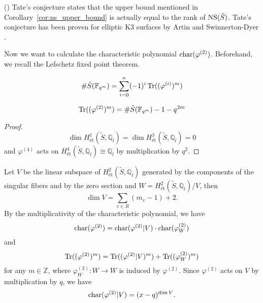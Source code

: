 \documentclass[main]{subfiles}
\begin{document}
\begin{rem}{(\cite[Remark 6.5.]{ref:vanluijk2007})}
    Tate's conjecture states that the upper bound mentioned in Corollary~\ref{cor:ns_upper_bound} is actually equal to the rank of $\operatorname{NS} (\tilde{S})$.
    Tate's conjecture has been proven for elliptic K3 surfaces by Artin and Swinnerton-Dyer \cite{ref:Artin1973}.
\end{rem}

Now we want to calculate the characteristic polynomial $\operatorname{char} (\varphi^{(2)})$.
Beforehand, we recall the Lefschetz fixed point theorem.

\begin{thm}
    \begin{equation*}
        \# \tilde{S}(\mathbb{F}_{q^{m}}) = \sum_{i = 0}^{n} ( - 1)^{i} \operatorname{Tr}((\varphi^{(i)})^{m})
    \end{equation*}
\end{thm}

\begin{cor}
    \label{cor:lefschetz}
    \begin{equation*}
        \operatorname{Tr} ((\varphi^{(2)})^{m}) = \# \tilde{S}(\mathbb{F}_{q^{m}}) - 1 - q^{2m}
    \end{equation*}
\end{cor}
\begin{proof}
    \begin{equation*}
        \dim H_{\text{\'et}}^{1}(\tilde{S}, \mathbb{Q}_{l}) = \dim H_{\text{\'et}}^{3}(\tilde{S}, \mathbb{Q}_{l}) = 0
    \end{equation*}
    and $\varphi^{(4)}$ acts on $H_{\text{\'et}}^{4}(\tilde{S}, \mathbb{Q}_l) \cong \mathbb{Q}_l$ by multiplication by $q^{2}$.
\end{proof}

Let $V$ be the linear subspace of $H_{\text{\'et}}^{2}(\tilde{S}, \mathbb{Q}_{l})$ generated by the components of the singular fibers and by the zero section and $W = H_{\text{\'et}}^{2}(\tilde{S}, \mathbb{Q}_l) / V$, then
\begin{equation*}
    \dim V = \sum_{v \in R} (m_{v} - 1) + 2.
\end{equation*}
By the multiplicativity of the characteristic polynomial, we have
\begin{equation*}
    \operatorname{char} (\varphi^{(2)}) = \operatorname{char} (\varphi^{(2)} | V) \cdot \operatorname{char} (\varphi^{(2)}_{W})
\end{equation*}
and
\begin{equation}
    \operatorname{Tr} ((\varphi^{(2)})^{m}) = \operatorname{Tr} ((\varphi^{(2)} | V)^{m}) + \operatorname{Tr} ((\varphi^{(2)}_{W})^{m}) \label{eq:trcomposition}
\end{equation}
for any $m \in \mathbb{Z}$, where $\varphi^{(2)}_W: W \to W$ is induced by $\varphi^{(2)}$.
Since $\varphi^{(2)}$ acts on $V$ by multiplication by $q$, we have
\begin{equation*}
    \operatorname{char} (\varphi^{(2)} | V) = (x - q)^{\dim V}.
\end{equation*}
\end{document}
